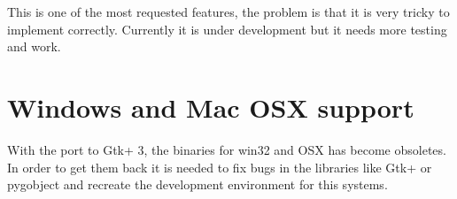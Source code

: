 This is one of the most requested features, the problem is that it is very tricky to implement correctly. Currently it is under development but it needs more testing and work.

\section{Windows and Mac OSX support}

With the port to Gtk+ 3, the binaries for win32 and OSX has become obsoletes. In order to get them back it is needed to fix bugs in the libraries like Gtk+ or pygobject and recreate the development environment for this systems.
